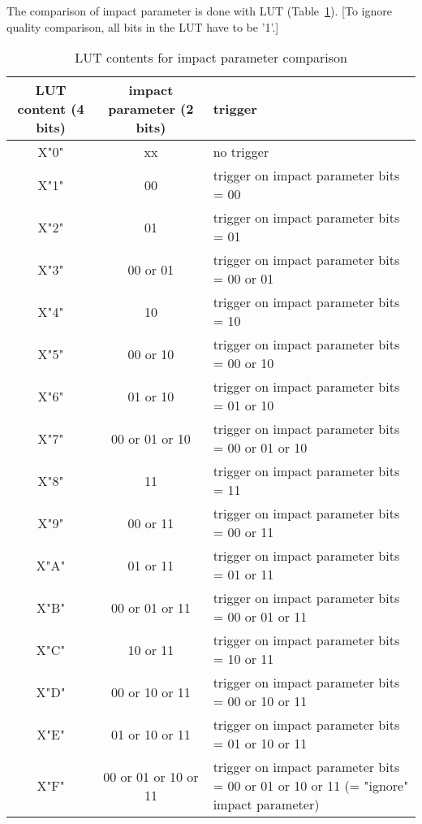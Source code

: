 \clearpage

The comparison of impact parameter is done with LUT (Table~\ref{tab:gtl:muon_lut_ip}). [To ignore quality comparison, all bits in the LUT have to be '1'.]

\begin{table}[htdp]
\begin{center}
\begin{tabular}{|c|c|p{}|}\hline
LUT content (4 bits) & impact parameter  (2 bits) & trigger \\\hline\hline
X"0" & xx & no trigger\\\hline
X"1" & 00 & trigger on impact parameter bits = 00\\\hline
X"2" & 01 & trigger on impact parameter bits = 01\\\hline
X"3" & 00 or 01 & trigger on impact parameter bits = 00 or 01\\\hline
X"4" & 10 & trigger on impact parameter bits = 10\\\hline
X"5" & 00 or 10 & trigger on impact parameter bits = 00 or 10\\\hline
X"6" & 01 or 10 & trigger on impact parameter bits = 01 or 10\\\hline
X"7" & 00 or 01 or 10 & trigger on impact parameter bits = 00 or 01 or 10\\\hline
X"8" & 11 & trigger on impact parameter bits = 11\\\hline
X"9" & 00 or 11 & trigger on impact parameter bits = 00 or 11\\\hline
X"A" & 01 or 11 & trigger on impact parameter bits = 01 or 11\\\hline
X"B" & 00 or 01 or 11 & trigger on impact parameter bits = 00 or 01 or 11\\\hline
X"C" & 10 or 11 & trigger on impact parameter bits = 10 or 11\\\hline
X"D" & 00 or 10 or 11 & trigger on impact parameter bits = 00 or 10 or 11\\\hline
X"E" & 01 or 10 or 11 & trigger on impact parameter bits = 01 or 10 or 11\\\hline
X"F" & 00 or 01 or 10 or 11 & trigger on impact parameter bits = 00 or 01 or 10 or 11 (= "ignore" impact parameter)\\\hline
\end{tabular}
\end{center}
\caption{LUT contents for impact parameter comparison}
\label{tab:gtl:muon_lut_ip}
\end{table}

